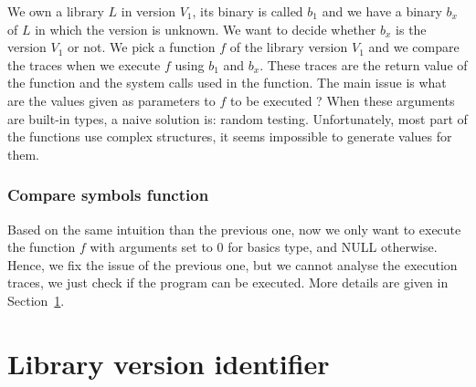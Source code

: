 \documentclass{article}
\newcommand{\symb}{{symbols}}
\newcommand{\comp}{{compilation}}
\begin{document}

	We own a library $L$ in version $V_1$, its binary is called $b_1$ and we have a binary $b_x$ of $L$ in which the version is unknown. We want to decide whether $b_x$ is the version $V_1$ or not. We pick a function $f$ of the library version $V_1$ and we compare the traces when we execute $f$ using $b_1$ and $b_x$.	
	These traces are the return value of the function and the system calls used in the function.
	 The main issue is what are the values given as parameters to $f$ to be executed ? When these arguments are built-in types, a naive solution is: random testing. Unfortunately, most part of the functions use complex structures, it seems impossible to generate values for them.	
	
	\subsubsection{Compare symbols function}
	
	Based on the same intuition than the previous one, now we only want to execute the function $f$ with arguments set to $0$ for basics type, and NULL otherwise. Hence, we fix the issue of the previous one, but we cannot analyse the execution traces, we just check if the program can be executed. More details are given in Section~\ref{section:libraryChecker}.
	



\section{Library version identifier}
\label{section:libraryChecker}
\end{document}
